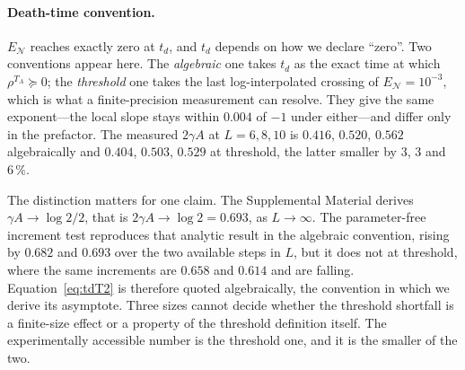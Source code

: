 \documentclass[aps,prl,reprint,amsmath,amssymb,floatfix]{revtex4-2}
\newcommand{\EN}{E_{\mathcal N}}
\begin{document}
\paragraph*{Death-time convention.}
$\EN$ reaches exactly zero at $t_d$, and $t_d$ depends on how we declare ``zero''. Two conventions appear here. The \emph{algebraic} one
takes $t_d$ as the exact time at which $\rho^{T_A}\succeq0$; the
\emph{threshold} one takes the last log-interpolated crossing of
$\EN=10^{-3}$, which is what a finite-precision measurement can resolve. They
give the same exponent---the local slope stays within $0.004$ of $-1$ under
either---and differ only in the prefactor. The measured $2\gamma A$ at
$L=6,8,10$ is $0.416$, $0.520$, $0.562$ algebraically and $0.404$, $0.503$,
$0.529$ at threshold, the latter smaller by $3$, $3$ and $6\,\%$.

The distinction matters for one claim. The
Supplemental Material derives $\gamma A\to\log2/2$, that is
$2\gamma A\to\log2=0.693$, as $L\to\infty$. The parameter-free increment test
reproduces that analytic result in the algebraic convention, rising by $0.682$
and $0.693$ over the two available steps in $L$, but it does not at threshold,
where the same increments are $0.658$ and $0.614$ and are falling.
Equation~\eqref{eq:tdT2} is therefore quoted algebraically, the convention in which we derive its asymptote. Three sizes cannot decide whether the
threshold shortfall is a finite-size effect or a property of the threshold
definition itself. The experimentally accessible number is the threshold one,
and it is the smaller of the two.
\end{document}
